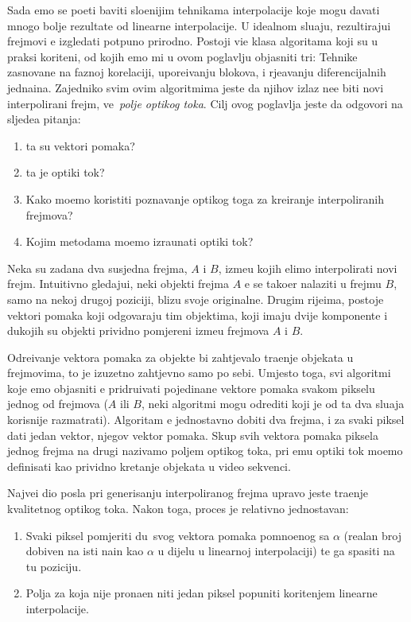 Sada \cj emo se po\ch eti baviti slo\zh enijim tehnikama interpolacije koje mogu davati mnogo bolje rezultate od linearne interpolacije. U idealnom slu\ch aju, rezultiraju\cj i frejmovi \cj e izgledati potpuno prirodno.
Postoji vi\sh e klasa algoritama koji su u praksi kori\sh teni, od kojih \cj emo mi u ovom poglavlju objasniti tri: Tehnike zasnovane na faznoj korelaciji, upore\dj ivanju blokova, i rje\sh avanju diferencijalnih jedna\ch ina. %
Zajedni\ch ko svim ovim algoritmima jeste da njihov izlaz ne\cj e biti novi interpolirani frejm, ve\cj\ \textit{polje opti\ch kog toka}.
Cilj ovog poglavlja jeste da odgovori na sljede\cj a pitanja:
\begin{enumerate}
\item \SH ta su vektori pomaka?
\item \SH ta je opti\ch ki tok?
\item Kako mo\zh emo koristiti poznavanje opti\ch kog toga za kreiranje interpoliranih frejmova?
\item Kojim metodama mo\zh emo izra\ch unati opti\ch ki tok?
\end{enumerate}

Neka su zadana dva susjedna frejma, $A$ i $B$, izme\dj u kojih \zh elimo interpolirati novi frejm. Intuitivno gledaju\cj i, neki objekti frejma $A$ \cj e se tako\dj er nalaziti u frejmu $B$, samo na nekoj drugoj poziciji, blizu
svoje originalne. Drugim rije\ch ima, postoje vektori pomaka koji odgovaraju tim objektima, koji imaju dvije komponente i du\zh kojih su objekti prividno pomjereni izme\dj u frejmova $A$ i $B$.

Odre\dj ivanje vektora pomaka za objekte bi zahtjevalo tra\zh enje objekata u frejmovima, \sh to je izuzetno zahtjevno samo po sebi. Umjesto toga, svi algoritmi koje \cj emo objasniti \cj e pridru\zh ivati pojedina\ch ne
vektore pomaka svakom pikselu jednog od frejmova ($A$ ili $B$, neki algoritmi mogu odrediti koji je od ta dva slu\ch aja korisnije razmatrati). Algoritam \cj e jednostavno dobiti dva frejma, i za svaki piksel dati jedan
vektor, njegov vektor pomaka. Skup svih vektora pomaka piksela jednog frejma na drugi nazivamo poljem opti\ch kog toka, pri \ch emu opti\ch ki tok mo\zh emo definisati kao prividno kretanje objekata u video
sekvenci.

Najve\cj i dio posla pri generisanju interpoliranog frejma upravo jeste tra\zh enje kvalitetnog opti\ch kog toka. Nakon toga, proces je relativno jednostavan:
\begin{enumerate}
\item Svaki piksel pomjeriti du\zh\ svog vektora pomaka pomno\zh enog sa $\alpha$ (realan broj dobiven na isti na\ch in kao $\alpha$ u dijelu u linearnoj interpolaciji) te ga spasiti na tu poziciju.
\item Polja za koja nije prona\dj en niti jedan piksel popuniti kori\sh tenjem linearne interpolacije.
\end{enumerate}

